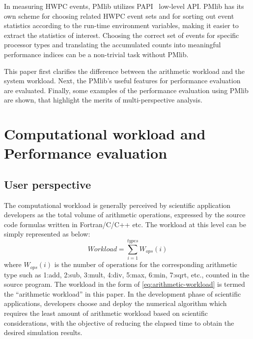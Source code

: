 \documentclass[conference]{IEEEtran}
\begin{document}
In measuring HWPC events, PMlib utilizes PAPI~\cite{PAPI:5.6} low-level API.
PMlib has its own scheme for choosing related HWPC event sets and for sorting
out event statistics according to the run-time environment variables, making it
easier to extract the statistics of interest.
Choosing the correct set of events for specific processor types and
translating the accumulated counts into meaningful performance indices can be
a non-trivial task without PMlib.

This paper first clarifies the difference between the arithmetic workload and
the system workload.
Next, the PMlib's useful features for performance evaluation are evaluated.
Finally, some examples of the performance evaluation using PMlib
are shown, that highlight the merits of multi-perspective analysis.

\section{Computational workload and Performance evaluation}
\label{workload-evaluation}

\subsection{User perspective}
\label{subsection:user-perspective}

The computational workload is generally perceived by scientific application
developers as the total volume of arithmetic operations,
expressed by the source code formulas written in Fortran/C/C++ etc.
The workload at this level can be simply represented as below:
\begin{equation}\label{eq:arithmetic-workload}
	Workload = \sum_{i=1}^{types} W_{ops}(i)
\end{equation}
where $ W_{ops}(i) $ is the number of operations for the
corresponding arithmetic type such as
1:add, 2:sub, 3:mult, 4:div, 5:max, 6:min, 7:sqrt, etc.,
counted in the source program.
The workload in the form of \eqref{eq:arithmetic-workload}
is termed the ``arithmetic workload'' in this paper.
In the development phase of scientific applications, developers
choose and deploy the numerical algorithm which requires the least
amount of arithmetic workload based on scientific considerations,
with the objective of reducing the elapsed time to obtain the desired
simulation results.
\end{document}
